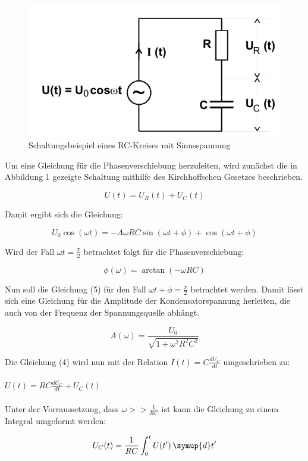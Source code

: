 \begin{figure}
  \centering
  \includegraphics[width=\textwidth]{Schaltungsbeispiel.png}
  \caption{Schaltungsbeispiel eines RC-Kreises mit Sinusspannung}
\end{figure}

Um eine Gleichung für die Phasenverschiebung herzuleiten, wird zunächst die in Abbildung 1
gezeigte Schaltung mithilfe des Kirchhoffschen Gesetzes beschrieben.

\begin{equation}
  U(t) = U_R(t) + U_C(t)
\end{equation}

Damit ergibt sich die Gleichung:

\begin{equation}
  U_0 \cos(\omega t) = -A\omega RC \sin(\omega t + \phi) + \cos(\omega t + \phi)
\end{equation}

Wird der Fall $\omega t = \frac{\pi}{2}$ betrachtet folgt für die Phasenverschiebung:

\begin{equation}
  \phi(\omega) = \arctan(-\omega RC)
\end{equation}

Nun soll die Gleichung (5) für den Fall $\omega t + \phi = \frac{\pi}{2}$ betrachtet werden.
Damit lässt sich eine Gleichung für die Amplitude der Kondensatorspannung herleiten, die
auch von der Frequenz der Spannungsquelle abhängt.

\begin{equation}
  A(\omega) = \frac{U_0}{\sqrt{1+\omega^2 R^2 C^2}}
\end{equation}

Die Gleichung (4) wird nun mit der Relation $I(t) = C\frac{dU_C}{dt}$ umgeschrieben zu:\\\\

$U(t) = RC \frac{dU_C}{dt} + U_C(t)$\\\\

Unter der Vorraussetzung, dass $\omega >> \frac{1}{RC}$ ist kann die Gleichung
zu einem Integral umgeformt werden:

\begin{equation}
  U_C(t) = \frac{1}{RC} \int_{0}^{t} U(t')  \, \symup{d}t'
\end{equation}
